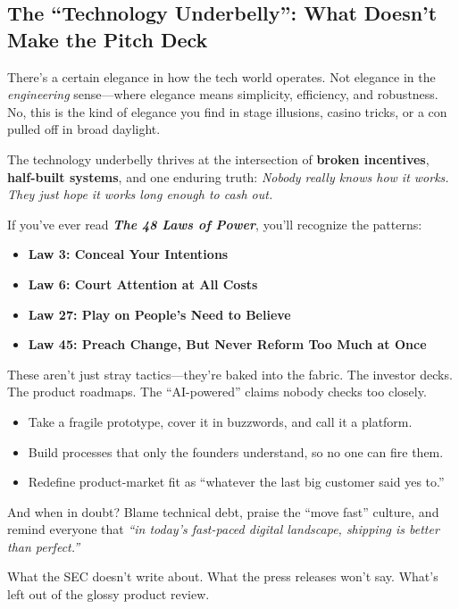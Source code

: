   \subsection{The ``Technology Underbelly'': What Doesn’t Make the Pitch Deck}

  There’s a certain elegance in how the tech world operates.  
  Not elegance in the \textit{engineering} sense—where elegance means simplicity, efficiency, and robustness.  
  No, this is the kind of elegance you find in stage illusions, casino tricks, or a con pulled off in broad daylight.
  
  The technology underbelly thrives at the intersection of \textbf{broken incentives}, \textbf{half-built systems}, and one enduring truth:  
  \textit{Nobody really knows how it works. They just hope it works long enough to cash out.}
  
  If you’ve ever read \textbf{\textit{The 48 Laws of Power}}, you’ll recognize the patterns:
  
  \begin{itemize}
    \item \textbf{Law 3: Conceal Your Intentions}
    \item \textbf{Law 6: Court Attention at All Costs}
    \item \textbf{Law 27: Play on People’s Need to Believe}
    \item \textbf{Law 45: Preach Change, But Never Reform Too Much at Once}
  \end{itemize}
  
  These aren’t just stray tactics—they’re baked into the fabric.  
  The investor decks. The product roadmaps. The “AI-powered” claims nobody checks too closely.
  
  \begin{itemize}
    \item Take a fragile prototype, cover it in buzzwords, and call it a platform.
    \item Build processes that only the founders understand, so no one can fire them.
    \item Redefine product-market fit as “whatever the last big customer said yes to.”
  \end{itemize}
  
  And when in doubt? Blame technical debt, praise the “move fast” culture, and remind everyone that  
  \textit{“in today’s fast-paced digital landscape, shipping is better than perfect.”}
  
  What the SEC doesn’t write about.  
  What the press releases won’t say.  
  What’s left out of the glossy product review.
  

